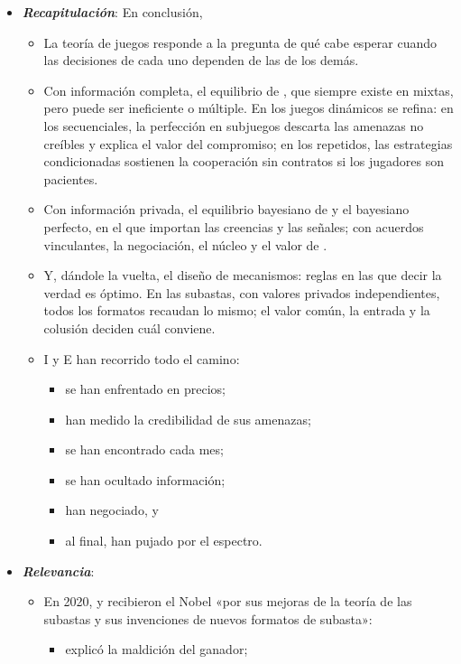\documentclass[11pt]{article}
\begin{document}
\begin{itemize}
\item \textbf{\emph{Recapitulación}}: En conclusión,
  \begin{itemize}
  \item La teoría de juegos responde a la pregunta de qué cabe esperar cuando las decisiones de cada uno dependen de las de los demás.
  \item Con información completa, el equilibrio de , que siempre existe en mixtas, pero puede ser ineficiente o múltiple. En los juegos dinámicos se refina: en los secuenciales, la perfección en subjuegos descarta las amenazas no creíbles y explica el valor del compromiso; en los repetidos, las estrategias condicionadas sostienen la cooperación sin contratos si los jugadores son pacientes.
  \item Con información privada, el equilibrio bayesiano de  y el bayesiano perfecto, en el que importan las creencias y las señales; con acuerdos vinculantes, la negociación, el núcleo y el valor de .
  \item Y, dándole la vuelta, el diseño de mecanismos: reglas en las que decir la verdad es óptimo. En las subastas, con valores privados independientes, todos los formatos recaudan lo mismo; el valor común, la entrada y la colusión deciden cuál conviene.
  \item I y E han recorrido todo el camino:
    \begin{itemize}
    \item se han enfrentado en precios;
    \item han medido la credibilidad de sus amenazas;
    \item se han encontrado cada mes;
    \item se han ocultado información;
    \item han negociado, y
    \item al final, han pujado por el espectro.
    \end{itemize}
  \end{itemize}
\item \textbf{\emph{Relevancia}}:
  \begin{itemize}
  \item En 2020,  y  recibieron el Nobel «por sus mejoras de la teoría de las subastas y sus invenciones de nuevos formatos de subasta»\nocite{Nobel2020MilgromWilson}:
    \begin{itemize}
    \item {} explicó la maldición del ganador;

\end{itemize}
\end{itemize}
\end{itemize}
\end{document}
